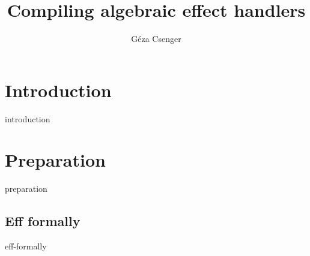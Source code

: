 \documentclass{book}
\title{Compiling algebraic effect handlers}
\author{Géza Csenger}
\date{}
\begin{document}
\maketitle
\tableofcontents

\chapter{Introduction}
{introduction}

\chapter{Preparation}
{preparation}

\begin{appendices}
    \chapter{Eff formally}
    {eff-formally}
\end{appendices}

{}

\end{document}

